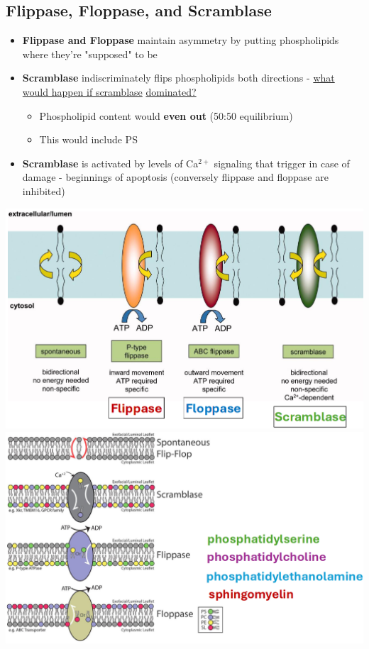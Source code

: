 \documentclass[10pt]{article}
\begin{document}
\subsection*{Flippase, Floppase, and Scramblase}
\begin{itemize}
    \item \textbf{Flippase and Floppase} maintain asymmetry by putting phospholipids where they're "supposed" to be
    \item \textbf{Scramblase} indiscriminately flips phospholipids both directions - \underline{what would happen if scramblase} \underline{dominated?}
    \begin{itemize}
        \item Phospholipid content would \textbf{even out} (50:50 equilibrium)
        \item This would include PS
    \end{itemize}
    \item \textbf{Scramblase} is activated by levels of Ca$^{2+}$ signaling that trigger in case of damage - beginnings of apoptosis (conversely flippase and floppase are inhibited)
\end{itemize}
\begin{center}
    \includegraphics*[width=\textwidth]{L3_13.png}\\
    \includegraphics*[width=\textwidth]{L3_14.png}
\end{center}
\end{document}
